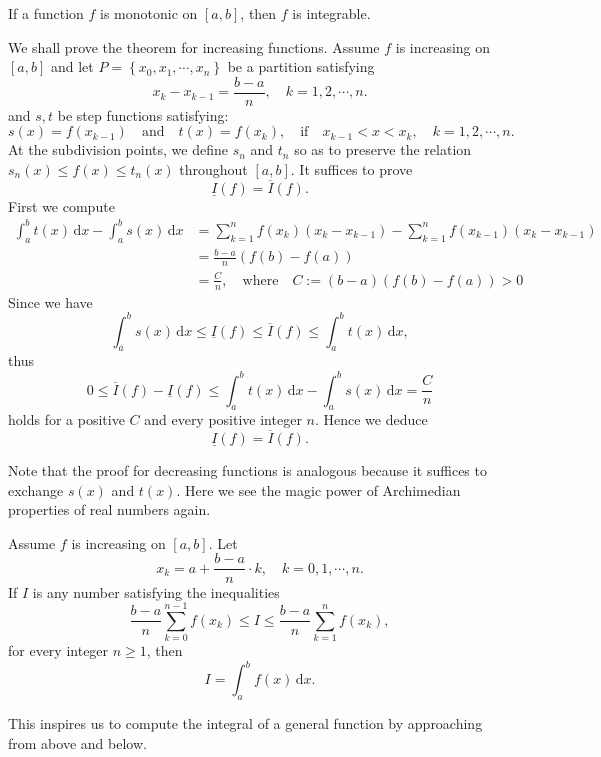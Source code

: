 	\begin{theoremenv}
		If a function $f$ is monotonic on $[a,b]$, then $f$ is integrable.
	\end{theoremenv}
	\begin{proofenv}
		We shall prove the theorem for increasing functions. Assume $f$ is increasing on $[a,b]$ and let $P=\left\{x_0,x_1,\cdots,x_n\right\}$ be a partition satisfying
		\[
		x_k - x_{k-1} = \frac{b-a}{n}, \quad k=1,2,\cdots,n.
		\]
		and $s,t$ be step functions satisfying:
		\[
		s(x)=f(x_{k-1})\quad \text{and}\quad t(x)=f(x_k),\quad \text{if}\quad x_{k-1}<x<x_k,\quad k=1,2,\cdots,n.
		\]
		At the subdivision points, we define $s_n$ and $t_n$ so as to preserve the relation $s_n(x)\le f(x)\le t_n(x)$ throughout $[a,b]$. 
		It suffices to prove
		\[
		\underline{I}(f) = \overline{I}(f).
		\]
		First we compute
		\begin{align*}
			\int_a^b t(x)\, \mathrm{d}x - \int_a^b s(x)\,\mathrm{d}x
			&= \sum_{k=1}^n f(x_k)(x_k-x_{k-1}) - \sum_{k=1}^n f(x_{k-1})(x_k-x_{k-1})\\[4pt]
			&= \frac{b-a}{n}\left(f(b)-f(a)\right) \\[4pt]
			&= \frac{C}{n}, \quad \text{where} \quad C:=(b-a)(f(b)-f(a))>0
		\end{align*}
		Since we have
		\[
		\int_a^b s(x)\,\mathrm{d}x \le \underline{I}(f)\le 
		\overline{I}(f) \le \int_a^b t(x)\, \mathrm{d}x,
		\]
		thus
		\[
		0 \le \overline{I}(f) - \underline{I}(f) 
		\le \int_a^b t(x)\, \mathrm{d}x - \int_a^b s(x)\,\mathrm{d}x
		= \frac{C}{n}
		\]
		holds for a positive $C$ and every positive integer $n$. Hence we deduce
		\[
		\underline{I}(f) = \overline{I}(f).
		\]
	\end{proofenv}
	\begin{remarkenv}
		Note that the proof for decreasing functions is analogous because it suffices to exchange $s(x)$ and $t(x)$. Here we see the magic power of Archimedian properties of real numbers again.
	\end{remarkenv}
	\begin{theoremenv}
		Assume $f$ is increasing on $[a,b]$. Let
		\[
		x_k = a + \frac{b-a}{n}\cdot k,\quad k=0,1,\cdots,n.
		\]
		If $I$ is any number satisfying the inequalities
		\[
		\frac{b-a}{n}\sum_{k=0}^{n-1}f(x_k) \le I \le
		\frac{b-a}{n}\sum_{k=1}^{n}f(x_k),
		\]
		for every integer $n\ge 1$,	then
		\[
		I = \int_a^b f(x)\,\mathrm{d}x.
		\]
	\end{theoremenv}
	\begin{remarkenv}
		This inspires us to compute the integral of a general function by approaching from above and below.
	\end{remarkenv}
